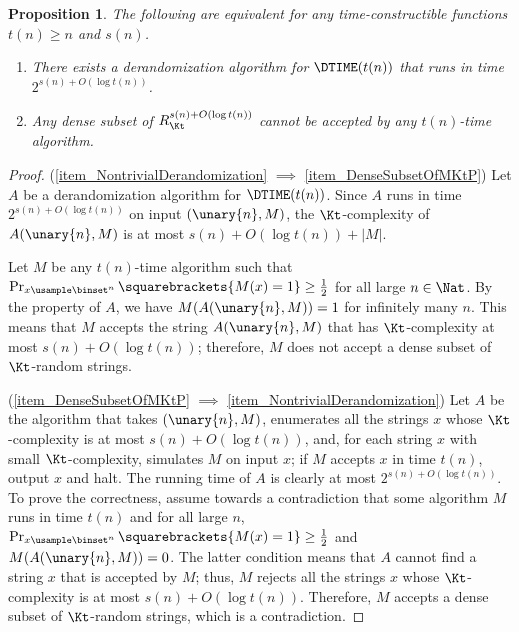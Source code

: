 \documentclass[11pt]{article}
\numberwithin{equation}{section}
\newtheorem{proposition}[theorem]{Proposition}
\theoremstyle{definition}
\theoremstyle{plain}
\begin{document}
\begin{proposition}
  \label{prop_DenseSubsetOfKt}
  The following are equivalent for any time-constructible functions $t(n) \ge n$ and $s(n)$.
  \begin{enumerate}
    \item
          \label{item_NontrivialDerandomization}
          There exists a derandomization algorithm for $\DTIME(t(n))$ that runs in time $2^{s(n) + O(\log t(n))}$.
    \item
          \label{item_DenseSubsetOfMKtP}
          Any dense subset of $R_\Kt^{s(n) + O(\log t(n))}$ cannot be accepted by any $t(n)$-time algorithm.
  \end{enumerate}
\end{proposition}
\begin{proof}
  (\cref{item_NontrivialDerandomization} $\implies$ \cref{item_DenseSubsetOfMKtP})
  Let $A$ be a derandomization algorithm for $\DTIME(t(n))$.
  Since $A$ runs in time $2^{s(n) + O(\log t(n))}$ on input $(\unary{n}, M)$,
  the $\Kt$-complexity of $A(\unary{n}, M)$ is at most $s(n) + O(\log t(n)) + |M|$.

  Let $M$ be any $t(n)$-time algorithm such that $\Pr_{x \usample \binset^n} \squarebrackets{ M(x) = 1 } \ge \frac{1}{2}$
  for all large $n \in \Nat$.
  By the property of $A$, we have $M(A(\unary{n}, M)) = 1$ for infinitely many $n$.
  This means that $M$ accepts the string $A(\unary{n}, M)$ that has $\Kt$-complexity at most $s(n) + O(\log t(n))$;
  therefore, $M$ does not accept a dense subset of $\Kt$-random strings.

  (\cref{item_DenseSubsetOfMKtP} $\implies$ \cref{item_NontrivialDerandomization})
  Let $A$ be the algorithm that
  takes $(\unary{n}, M)$,
  enumerates all the strings $x$ whose $\Kt$-complexity is at most $s(n) + O(\log t(n))$,
  and,
  for each string $x$ with small $\Kt$-complexity,
  simulates $M$ on input $x$; if $M$ accepts $x$ in time $t(n)$, output $x$ and halt.
  The running time of $A$ is clearly at most $2^{s(n) + O(\log t(n))}$.
  To prove the correctness, assume towards a contradiction that some algorithm $M$ runs in time $t(n)$ and for all large $n$,
  $\Pr_{x \usample \binset^n} \squarebrackets{ M(x) = 1 } \ge \frac{1}{2}$ and $M(A(\unary{n}, M)) = 0$.
  The latter condition means that $A$ cannot find a string $x$ that is accepted by $M$; thus,
  $M$ rejects all the strings $x$ whose $\Kt$-complexity is at most $s(n) + O(\log t(n))$.
  Therefore, $M$ accepts a dense subset of $\Kt$-random strings, which is a contradiction.
\end{proof}
\end{document}
